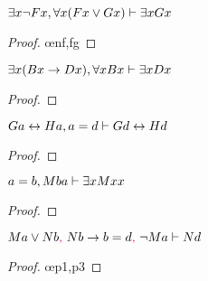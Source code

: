 \begin{earg}
\noindent\begin{minipage}{0.99\textwidth}
\item $\exists x {\neg} Fx, \forall x(Fx \vee Gx) \vdash \exists xGx$

\begin{proof}
	 \pr{}
	 \pr{}
	\open
		 \as{}
		 
		 \oe{nf,fg}
		 
	\close
	 
\end{proof}
\bigskip
\end{minipage}

\noindent\begin{minipage}{0.99\textwidth}
\item $\exists x(Bx \rightarrow Dx), \forall xBx \vdash \exists xDx$

\begin{proof}
	 \pr{}
	 \pr{}
	\open
		 \as{}
		 
		 
		 
	\close
	 
\end{proof}
\bigskip
\end{minipage}

\item $Ga \leftrightarrow Ha, a=d \vdash Gd \leftrightarrow Hd$

\begin{proof}
	 \pr{}
	 \pr{}
	 
\end{proof}
\bigskip

\noindent\begin{minipage}{0.99\textwidth}
\item $a=b, Mba \vdash \exists xMxx$

\begin{proof}
	 \pr{}
	 \pr{}
	 
	 
\end{proof}
\smallskip
\end{minipage}

\noindent\begin{minipage}{0.99\textwidth}
\item $Ma \vee Nb\textcolor{magenta}{,}~ Nb \rightarrow b=d\textcolor{magenta}{,}~ {\neg} Ma  \vdash Nd$

\begin{proof}
	 \pr{}
	 \pr{}
	 \pr{}
	 \oe{p1,p3}
	 
	 
\end{proof}
\medskip
\end{minipage}


\end{earg}

